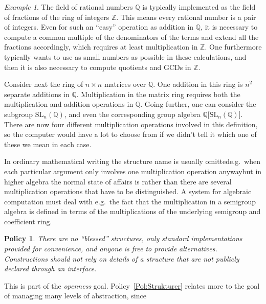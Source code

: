 \documentclass{mtmtcl}
\theoremstyle{plain}
\newtheorem{policy}{Policy}
\theoremstyle{remark}
\newtheorem*{example}{Example}
\begin{document}
\begin{example}
  The field of rational numbers $\mathbb{Q}$ is typically implemented 
  as the field of fractions of the ring of integers $\mathbb{Z}$. 
  This means every rational number is a pair of integers. Even for 
  such an ``easy'' operation as addition in $\mathbb{Q}$, it is 
  necessary to compute a common multiple of the denominators of the 
  terms and extend all the fractions accordingly, which requires at 
  least multiplication in $\mathbb{Z}$. One furthermore typically 
  wants to use as small numbers as possible in these calculations, 
  and then it is also necessary to compute quotients and GCDs in 
  $\mathbb{Z}$.
  
  Consider next the ring of $n \times n$ matrices over $\mathbb{Q}$. 
  One addition in this ring is $n^2$ separate additions in $\mathbb{Q}$. 
  Multiplication in the matrix ring requires both the multiplication 
  and addition operations in $\mathbb{Q}$. Going further, one can 
  consider the subgroup $\mathrm{SL}_n(\mathbb{Q})$, and even the 
  corresponding group algebra $\mathbb{Q}\bigl[ 
  \mathrm{SL}_n(\mathbb{Q}) \bigr]$. There are now four different 
  multiplication operations involved in this definition, so the 
  computer would have a lot to choose from if we didn't tell it which 
  one of these we mean in each case.
\end{example}

In ordinary mathematical writing the structure name 
is usually omitted\Ldash e.g.~when each particular argument only 
involves one multiplication operation anyway\Rdash but in higher 
algebra the normal state of affairs is rather than there are 
several multiplication operations that have to be distinguished. 
A system for algebraic computation must deal with e.g.~the fact 
that the multiplication in a semigroup algebra is defined in 
terms of the multiplications of the underlying semigroup and 
coefficient ring.

\begin{policy}
  There are no ``blessed'' structures, only standard implementations 
  provided for convenience, and anyone is free to provide 
  alternatives. Constructions should not rely on details of a 
  structure that are not publicly declared through an interface.
\end{policy}

This is part of the \emph{openness} goal. Policy~\ref{Pol:Strukturer} 
relates more to the goal of managing many levels of abstraction, 
since 
\end{document}
